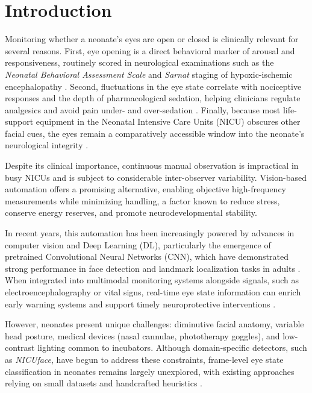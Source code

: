 \documentclass[runningheads]{llncs}
\begin{document}
\section{Introduction}
\label{sec:introduction}

Monitoring whether a neonate’s eyes are open or closed is clinically relevant for several reasons. First, eye opening is a direct behavioral marker of arousal and responsiveness, routinely scored in neurological examinations such as the \textit{Neonatal Behavioral Assessment Scale} and \textit{Sarnat} staging of hypoxic-ischemic encephalopathy \cite{kurinczuk2010epidemiology}. Second, fluctuations in the eye state correlate with nociceptive responses and the depth of pharmacological sedation, helping clinicians regulate analgesics and avoid pain under- and over-sedation \cite{brown1964states}. Finally, because most life-support equipment in the Neonatal Intensive Care Units (NICU) obscures other facial cues, the eyes remain a comparatively accessible window into the neonate’s neurological integrity \cite{deindl2025eyes}.

Despite its clinical importance, continuous manual observation is impractical in busy NICUs and is subject to considerable inter-observer variability. Vision-based automation offers a promising alternative, enabling objective high-frequency measurements while minimizing handling, a factor known to reduce stress, conserve energy reserves, and promote neurodevelopmental stability.

In recent years, this automation has been increasingly powered by advances in computer vision and Deep Learning (DL), particularly the emergence of pretrained Convolutional Neural Networks (CNN), which have demonstrated strong performance in face detection and landmark localization tasks in adults \cite{niu2020decade}. When integrated into multimodal monitoring systems alongside signals, such as electroencephalography or vital signs, real-time eye state information can enrich early warning systems and support timely neuroprotective interventions \cite{singh2018neo}.

However, neonates present unique challenges: diminutive facial anatomy, variable head posture, medical devices (nasal cannulae, phototherapy goggles), and low-contrast lighting common to incubators. Although domain-specific detectors, such as \textit{NICUface}, have begun to address these constraints, frame-level eye state classification in neonates remains largely unexplored, with existing approaches relying on small datasets and handcrafted heuristics \cite{dosso2022nicuface}.
\end{document}
